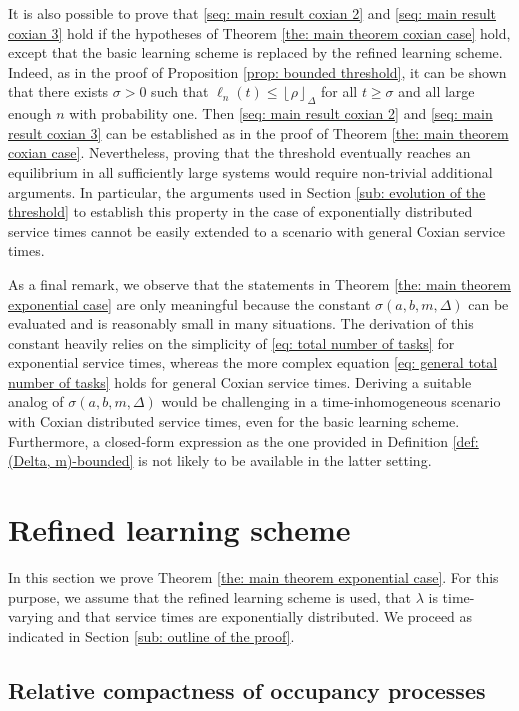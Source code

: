 \documentclass[a4paper, 12pt]{article}
\theoremstyle{definition}
\newcommand{\floor}[1]{\left\lfloor#1\right\rfloor}
\begin{document}
It is also possible to prove that \eqref{seq: main result coxian 2} and \eqref{seq: main result coxian 3} hold if the hypotheses of Theorem \ref{the: main theorem coxian case} hold, except that the basic learning scheme is replaced by the refined learning scheme. Indeed, as in the proof of Proposition \ref{prop: bounded threshold}, it can be shown that there exists $\sigma > 0$ such that $\ell_n(t) \leq \floor{\rho}_\Delta$ for all $t \geq \sigma$ and all large enough $n$ with probability one. Then \eqref{seq: main result coxian 2} and \eqref{seq: main result coxian 3} can be established as in the proof of Theorem \ref{the: main theorem coxian case}. Nevertheless, proving that the threshold eventually reaches an equilibrium in all sufficiently large systems would require non-trivial additional arguments. In particular, the arguments used in Section \ref{sub: evolution of the threshold} to establish this property in the case of exponentially distributed service times cannot be easily extended to a scenario with general Coxian service times.

As a final remark, we observe that the statements in Theorem \ref{the: main theorem exponential case} are only meaningful because the constant $\sigma(a, b, m, \Delta)$ can be evaluated and is reasonably small in many situations. The derivation of this constant heavily relies on the simplicity of \eqref{eq: total number of tasks} for exponential service times, whereas the more complex equation \eqref{eq: general total number of tasks} holds for general Coxian service times. Deriving a suitable analog of $\sigma(a, b, m, \Delta)$ would be challenging in a time-inhomogeneous scenario with Coxian distributed service times, even for the basic learning scheme. Furthermore, a closed-form expression as the one provided in Definition \ref{def: (Delta, m)-bounded} is not likely to be available in the latter setting.

\section{Refined learning scheme}
\label{sec: refined learning scheme}

In this section we prove Theorem \ref{the: main theorem exponential case}. For this purpose, we assume that the refined learning scheme is used, that $\lambda$ is time-varying and that service times are exponentially distributed. We proceed as indicated in Section \ref{sub: outline of the proof}.

\subsection{Relative compactness of occupancy processes}
\label{sub: relative compactness exponential case}
\end{document}
